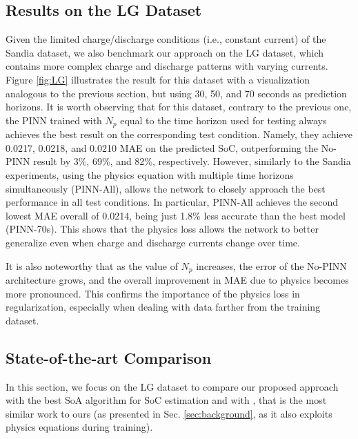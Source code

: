 \subsection{Results on the LG Dataset}
\label{sec:lg-results}
Given the limited charge/discharge conditions (i.e., constant current) of the Sandia dataset, we also benchmark our approach on the LG dataset, which contains more complex charge and discharge patterns with varying currents.
Figure \ref{fig:LG} illustrates the result for this dataset with a visualization analogous to the previous section, but using 30, 50, and 70 seconds as prediction horizons.
It is worth observing that for this dataset, contrary to the previous one, the PINN trained with $N_p$ equal to the time horizon used for testing always achieves the best result on the corresponding test condition. 
%
Namely, they achieve 0.0217, 0.0218, and 0.0210 MAE on the predicted SoC, outperforming the No-PINN result by 3\%, 69\%, and 82\%, respectively.
%
However, similarly to the Sandia experiments, using the physics equation with multiple time horizons simultaneously (PINN-All), allows the network to closely approach the best performance in all test conditions. 
%
In particular, PINN-All achieves the second lowest MAE overall of 0.0214, being just 1.8\% less accurate than the best model (PINN-70s).
%
This shows that the physics loss allows the network to better generalize even when charge and discharge currents change over time.


It is also noteworthy that as the value of $N_p$ increases, the error of the No-PINN architecture grows, and the overall improvement in MAE due to physics becomes more pronounced. This confirms the importance of the physics loss in regularization, especially when dealing with data farther from the training dataset.
\vspace{-0.25cm}
\subsection{State-of-the-art Comparison}
\vspace{-0.1cm}
In this section, we focus on the LG dataset to compare our proposed approach with the best SoA algorithm for SoC estimation \cite{wong-2021} and with \cite{Dang23}, that is the most similar work to ours (as presented in Sec. \ref{sec:background}, as it also exploits physics equations during training).%

